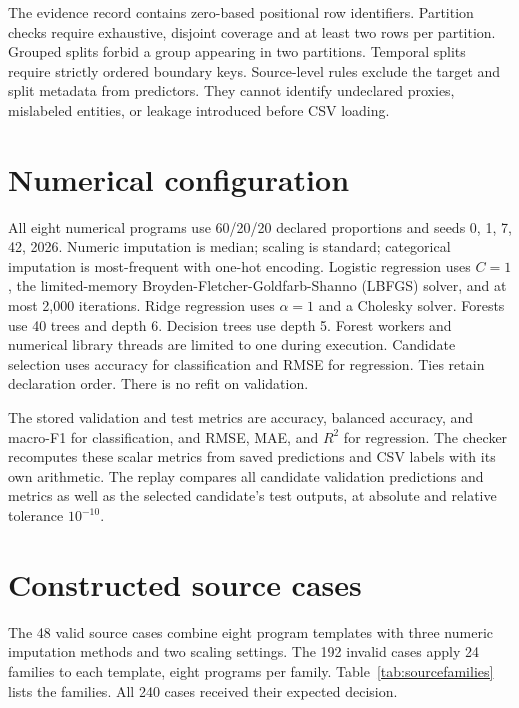 \documentclass[11pt,letterpaper]{article}
\begin{document}
The evidence record contains zero-based positional row identifiers. Partition checks require exhaustive, disjoint coverage and at least two rows per partition. Grouped splits forbid a group appearing in two partitions. Temporal splits require strictly ordered boundary keys. Source-level rules exclude the target and split metadata from predictors. They cannot identify undeclared proxies, mislabeled entities, or leakage introduced before CSV loading.

\section{Numerical configuration}
All eight numerical programs use 60/20/20 declared proportions and seeds 0, 1, 7, 42, 2026. Numeric imputation is median; scaling is standard; categorical imputation is most-frequent with one-hot encoding. Logistic regression uses $C=1$, the limited-memory Broyden-Fletcher-Goldfarb-Shanno (LBFGS) solver, and at most 2,000 iterations. Ridge regression uses $\alpha=1$ and a Cholesky solver. Forests use 40 trees and depth 6. Decision trees use depth 5. Forest workers and numerical library threads are limited to one during execution. Candidate selection uses accuracy for classification and RMSE for regression. Ties retain declaration order. There is no refit on validation.

The stored validation and test metrics are accuracy, balanced accuracy, and macro-F1 for classification, and RMSE, MAE, and $R^2$ for regression. The checker recomputes these scalar metrics from saved predictions and CSV labels with its own arithmetic. The replay compares all candidate validation predictions and metrics as well as the selected candidate's test outputs, at absolute and relative tolerance $10^{-10}$.

\section{Constructed source cases}
The 48 valid source cases combine eight program templates with three numeric imputation methods and two scaling settings. The 192 invalid cases apply 24 families to each template, eight programs per family. Table~\ref{tab:sourcefamilies} lists the families. All 240 cases received their expected decision.
\end{document}

